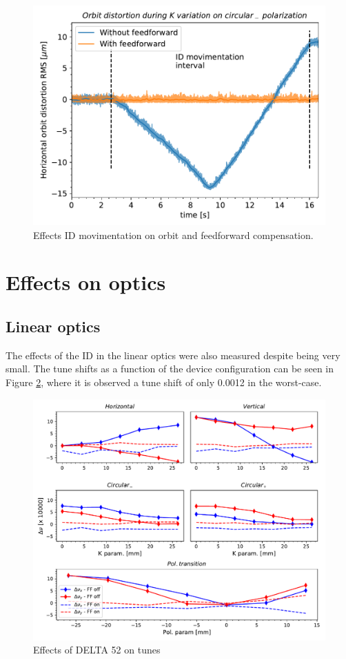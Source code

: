 \documentclass[a4paper,
               keeplastbox,   %
               ]{jacow}
\begin{document}
\begin{figure}[!h]
    \centering
   \includegraphics[width=0.8\columnwidth]{THPS18_f4.pdf}
   \caption{Effects ID movimentation on orbit and feedforward compensation.}
   \label{fig:orbit_fast}
\end{figure}

\section{Effects on optics}
\subsection{Linear optics}

The effects of the ID in the linear optics were also measured despite being very small. The tune shifts as a function of the device configuration can be seen in Figure \ref{fig:tunes}, where it is observed a tune shift of only 0.0012 in the worst-case.

\begin{figure}[!h]
    \centering
   \includegraphics[width=\columnwidth]{Tune_deviation.pdf}
   \caption{Effects of DELTA 52 on tunes}
   \label{fig:tunes}
\end{figure}
\end{document}
